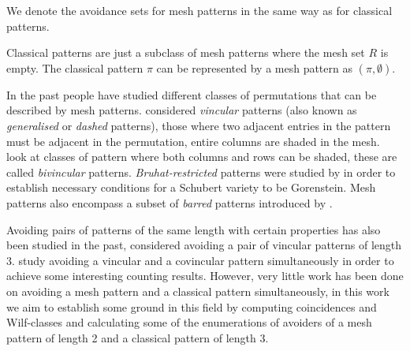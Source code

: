 We denote the avoidance sets for mesh patterns in the same way as for
classical patterns.

\begin{note}
    \label{not:classmesh}
    Classical patterns are just a subclass of mesh patterns where the mesh
    set \(R\) is empty. The classical pattern \(\pi\) can be represented
    by a mesh pattern as \((\pi,\emptyset)\).
\end{note}

In the past people have studied different classes
of permutations that can be described by mesh patterns. \textcite{babstein2000}
considered \emph{vincular} patterns (also known as \emph{generalised} or \emph{dashed} patterns),
those where two adjacent entries in the pattern must be adjacent in the permutation,
\ie entire columns are shaded in the mesh.
\textcite{MR2652101} look at classes of pattern where both columns and rows
can be shaded, these are called \emph{bivincular} patterns.
\emph{Bruhat-restricted} patterns were studied by \textcite{MR2264071} in order
to establish necessary conditions for a Schubert variety to be Gorenstein.
Mesh patterns also encompass a subset of \emph{barred} patterns introduced by
\textcite{MR2716312}.

Avoiding pairs of patterns of the same length with certain properties has
also been studied in the past, \textcite{MR2178749} considered avoiding a
pair of vincular patterns of length 3. \textcite{2015arXiv151203226B} study avoiding
a vincular and a covincular pattern simultaneously in order to achieve some
interesting counting results. However, very little work has been done on avoiding
a mesh pattern and a classical pattern simultaneously, in this work we aim to
establish some ground in this field by computing coincidences and Wilf-classes
and calculating some of the enumerations of avoiders of a mesh pattern of length
2 and a classical pattern of length 3.

